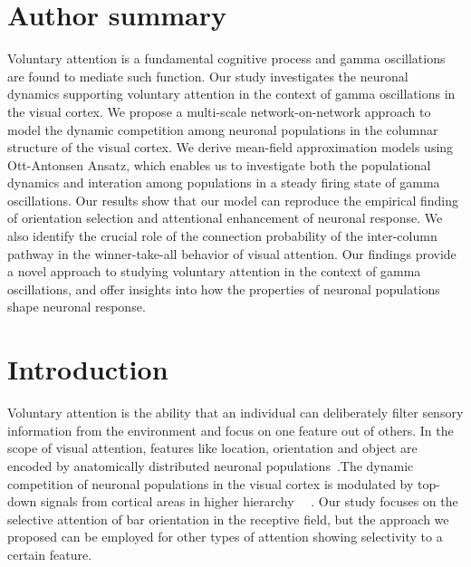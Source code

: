 \documentclass[10pt,letterpaper]{article}
\begin{document}
\section*{Author summary}
Voluntary attention is a fundamental cognitive process and gamma oscillations are found to mediate such function. Our study investigates the neuronal dynamics supporting voluntary attention in the context of gamma oscillations in the visual cortex. We propose a multi-scale network-on-network approach to model the dynamic competition among neuronal populations in the columnar structure of the visual cortex. We derive mean-field approximation models using Ott-Antonsen Ansatz, which enables us to investigate both the populational dynamics and interation among populations in a steady firing state of gamma oscillations. Our results show that our model can reproduce the empirical finding of orientation selection and attentional enhancement of neuronal response. We also identify the crucial role of the connection probability of the inter-column pathway in the winner-take-all behavior of visual attention. Our findings provide a novel approach to studying voluntary attention in the context of gamma oscillations, and offer insights into how the properties of neuronal populations shape neuronal response.


\linenumbers

\section*{Introduction}

Voluntary attention is the ability that an individual can deliberately filter sensory information from the environment and focus on one feature out of others. In the scope of visual attention, features like location, orientation and object are encoded by anatomically distributed neuronal populations~\cite{serences2006}.The dynamic competition of neuronal populations in the visual cortex is modulated by top-down signals from cortical areas in higher hierarchy ~\cite{katsuki2014}~\cite{paneri2017}. Our study focuses on the selective attention of bar orientation in the receptive field, but the approach we proposed can be employed for other types of attention showing selectivity to a certain feature.
\end{document}

